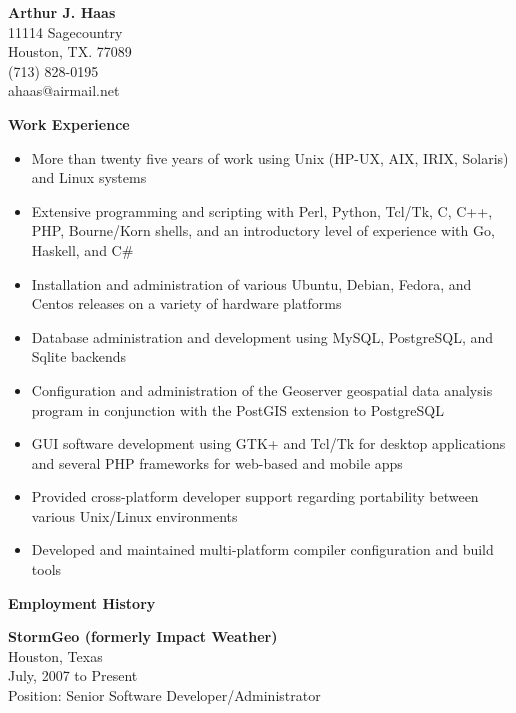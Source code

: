 \documentclass[10pt]{article}
\begin{document}
\begin{center}
\textbf{\large Arthur J. Haas}\\
11114 Sagecountry\\
Houston, TX. 77089\\
(713) 828-0195\\
ahaas@airmail.net\\
\end{center}

\textbf{\large Work Experience}

\begin{itemize}
\item More than twenty five years of work using Unix (HP-UX, AIX, IRIX, Solaris) and Linux systems
\item Extensive programming and scripting with Perl, Python, Tcl/Tk, C, C++, PHP, Bourne/Korn shells, and an introductory level of experience with Go, Haskell, and C\#
\item Installation and administration of various Ubuntu, Debian, Fedora, and Centos releases on a variety of hardware platforms
\item Database administration and development using MySQL, PostgreSQL, and Sqlite backends
\item Configuration and administration of the Geoserver geospatial data analysis program in conjunction with the PostGIS extension to PostgreSQL
\item GUI software development using GTK+ and Tcl/Tk for desktop applications
and several PHP frameworks for web-based and mobile apps
\item Provided cross-platform developer support regarding portability between various Unix/Linux environments
\item Developed and maintained multi-platform compiler configuration and build tools
\end{itemize}

\textbf{\large Employment History}

\textbf{StormGeo (formerly Impact Weather)}\\
Houston, Texas\\
July, 2007 to Present\\
Position: Senior Software Developer/Administrator
\end{document}
